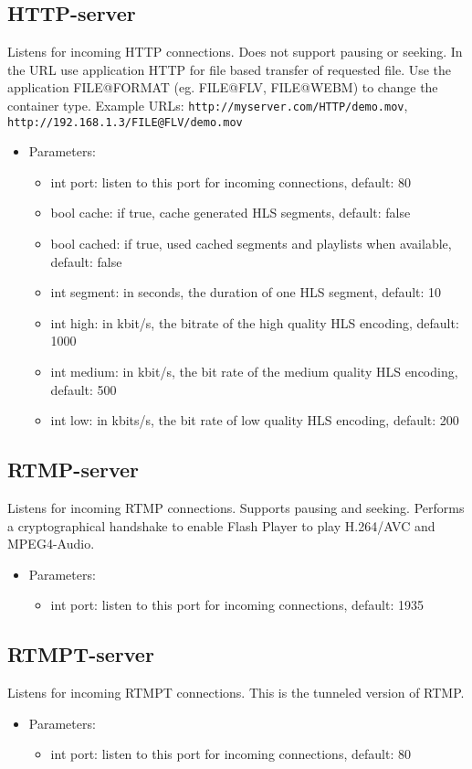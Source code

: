 \subsection{HTTP-server}
Listens for incoming HTTP connections. Does not support pausing or seeking. In the URL use application HTTP for file based transfer of requested file. Use the application FILE@FORMAT (eg. FILE@FLV, FILE@WEBM) to change the container type. Example URLs: \texttt{http://myserver.com/HTTP/demo.mov}, \texttt{http://192.168.1.3/FILE@FLV/demo.mov}
\begin{itemize}
\item Parameters:
\begin{itemize}
\item int port: listen to this port for incoming connections, default: 80
\item bool cache: if true, cache generated HLS segments, default: false
\item bool cached: if true, used cached segments and playlists when available, default: false
\item int segment: in seconds, the duration of one HLS segment, default: 10
\item int high: in kbit/s, the bitrate of the high quality HLS encoding, default: 1000
\item int medium: in kbit/s, the bit rate of the medium quality HLS encoding, default: 500
\item int low: in kbits/s, the bit rate of low quality HLS encoding, default: 200
\end{itemize}
\end{itemize}
\subsection{RTMP-server}
Listens for incoming RTMP connections. Supports pausing and seeking. Performs a cryptographical handshake to enable Flash Player to play H.264/AVC and MPEG4-Audio.
\begin{itemize}
\item Parameters:
\begin{itemize}
\item int port: listen to this port for incoming connections, default: 1935
\end{itemize}
\end{itemize}
\subsection{RTMPT-server}
Listens for incoming RTMPT connections. This is the tunneled version of RTMP.
\begin{itemize}
\item Parameters:
\begin{itemize}
\item int port: listen to this port for incoming connections, default: 80
\end{itemize}
\end{itemize}
